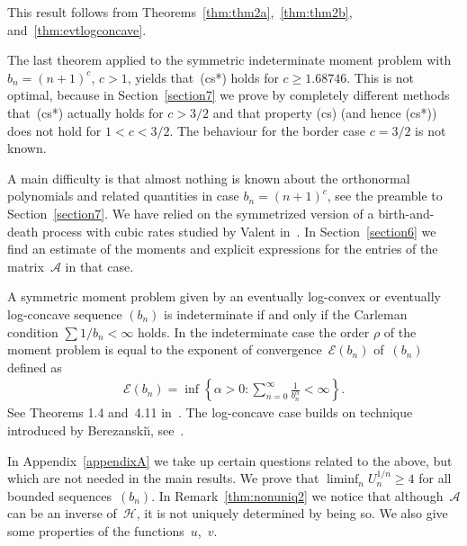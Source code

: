 \documentclass[pdftex]{sigma}
\numberwithin{equation}{section}
\begin{document}
This result follows from Theorems~\ref{thm:thm2a},~\ref{thm:thm2b}, and~\ref{thm:evtlogconcave}.

The last theorem applied to the symmetric indeterminate moment problem with $b_n=(n+1)^c$, $c>1$, yields that~(cs*) holds for $c\ge 1.68746$. This is not optimal, because in Section~\ref{section7} we prove by completely different methods that~(cs*) actually holds for $c>3/2$ and that property (cs) (and hence (cs*)) does not hold for $1<c<3/2$. The behaviour for the border case $c=3/2$ is not known.

A main difficulty is that almost nothing is known about the orthonormal polynomials and related quantities in case $b_n=(n+1)^c$, see the preamble to Section~\ref{section7}. We have relied on the symmetrized version of a birth-and-death process with cubic rates studied by Valent in~\cite{Va98}. In Section~\ref{section6} we find an estimate of the moments and explicit expressions for the entries of the matrix~$\mathcal A$ in that case.

A symmetric moment problem given by an eventually log-convex or eventually log-concave sequence $(b_n)$ is indeterminate if and only if the Carleman condition $\sum 1/b_n<\infty$ holds. In the indeterminate case the order $\rho$ of the moment problem is equal to the exponent of convergence~$\mathcal E(b_n)$ of~$(b_n)$ defined as
\begin{gather*}
\mathcal E(b_n)=\inf\left\{\alpha>0 \colon \sum_{n=0}^\infty \frac{1}{b_n^\alpha}<\infty\right\}.
\end{gather*}
See Theorems 1.4 and~4.11 in~\cite{B:S2}. The log-concave case builds on technique introduced by Berezanski\u{\i}, see~\cite[p.~26]{Ak}.

In Appendix~\ref{appendixA} we take up certain questions related to the above, but which are not needed in the main results. We prove that $\liminf_n U_n^{1/n}\ge 4$ for all bounded sequences~$(b_n)$. In Remark~\ref{thm:nonuniq2} we notice that although~$\mathcal A$ can be an inverse of~$\mathcal H$, it is not uniquely determined by being so. We also give some properties of the functions~$u$,~$v$.
\end{document}
